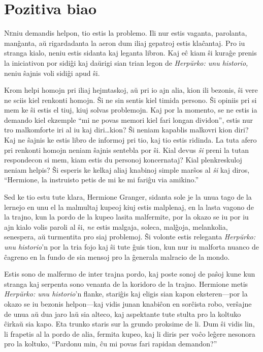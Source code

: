 \chapter {Pozitiva biao}

\lettrine{N}eniu demandis helpon, tio estis la problemo. Ili nur estis
vaganta, parolanta, manĝanta, aŭ rigardadanta la aeron dum iliaj
gepatroj estis klaĉantaj. Pro iu stranga kialo, neniu estis sidanta
kaj leganta libron. Kaj eĉ kiam ŝi kuraĝe prenis la iniciativon por
sidiĝi kaj daŭrigi sian trian legon de \emph{Herpŭrko: unu historio,}
neniu ŝajnis voli sidiĝi apud ŝi.

Krom helpi homojn pri iliaj hejmtaskoj, aŭ pri io ajn alia, kion ili
bezonis, ŝi vere ne sciis kiel renkonti homojn. Ŝi ne sin sentis kiel
timida persono. Ŝi opiniis pri si mem ke ŝi estis el tiuj, kiuj solvas
problemojn. Kaj por la momento, se ne estis ia demando kiel ekzemple
``mi ne povas memori kiel fari longan dividon'', estis nur tro
malkomforte iri al iu kaj diri\ldots kion? Ŝi neniam kapablis malkovri
kion diri? Kaj ne ŝajnis ke estis libro de informoj pri tio, kaj tio
estis ridinda. La tuta afero pri renkonti homojn neniam ŝajnis
sentebla por ŝi. Kial devus \emph{ŝi} preni la tutan respondecon si
mem, kiam estis du personoj koncernataj? Kial plenkreskuloj neniam
helpis?  Ŝi esperis ke kelkaj aliaj knabinoj simple marŝos al
\emph{ŝi} kaj diros, ``Hermione, la instruisto petis de mi ke mi
fariĝu via amikino.''

Sed ke tio estu tute klara, Hermione Granger, sidanta sole je la unua
tago de la lernejo en unu el la malmultaj kupeoj kiuj estis malplenaj,
en la lasta vagono de la trajno, kun la pordo de la kupeo lasita
malfermite, por la okazo se iu por iu ajn kialo volis paroli al ŝi,
\emph{ne} estis malgaja, soleca, malĝoja, melankolia, senespera, aŭ
turmentita pro siaj problemoj. Ŝi volonte estis releganta
\emph{Herpŭrko: unu historio}'n por la tria fojo kaj ŝi tute ĝuis
tion, kun nur iu malforta nuanco de ĉagreno en la fundo de sia mensoj
pro la ĝenerala malracio de la mondo.

Estis sono de malfermo de inter trajna pordo, kaj poste sonoj de paŝoj
kune kun stranga kaj serpenta sono venanta de la koridoro de la
trajno. Hermione metis \emph{Herpŭrko: unu historio}'n flanke,
stariĝis kaj eligis sian kapon eksteren—por la okazo se iu bezonis
helpon—kaj vidis junan knabiĉon en sorĉista robo, verŝajne de unua aŭ
dua jaro laŭ sia alteco, kaj aspektante tute stulta pro la koltuko
ĉirkaŭ sia kapo. Eta trunko staris sur la grundo proksime de li. Dum
ŝi vidis lin, li frapetis al la pordo de alia, fermita kupeo, kaj li
diris per voĉo leĝere nesonora pro la koltuko, ``Pardonu min, ĉu mi
povas fari rapidan demandon?''

